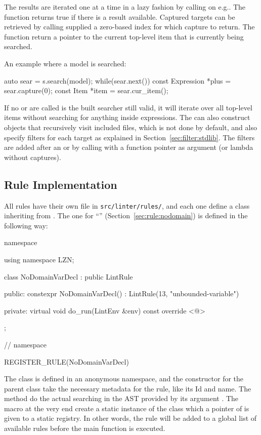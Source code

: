 \documentclass[a4paper,12pt]{article}
\newcommand{\ruleref}[1]{``\nameref{sec:rule:#1}'' (Section~\ref{sec:rule:#1})}
\begin{document}
The results are iterated one at a time in a lazy fashion by calling  on e.g.\@ {}.
The function returns true if there is a result available. Captured targets can be
retrieved by calling  supplied a zero-based index for which capture to return.
The function  return a pointer to the current top-level item that is currently
being searched.

An example where a model is searched:
\begin{cppp}[style=nonumbers]
auto sear = s.search(model);
while(sear.next()) {
  const Expression *plus = sear.capture(0);
  const Item *item = sear.cur_item();
}
\end{cppp}

If no  or  are called is the built searcher still valid, it will
iterate over all top-level items without searching for anything inside expressions.
The  can also construct  objects that recursively visit
included files, which is not done by default, and also specify filters for each target as
explained in Section~\ref{sec:filter:stdlib}. The filters are added after an 
or  by calling  with a function pointer as argument (or lambda
without captures).

\fussy %
\subsection{Rule Implementation}\label{sec:impl:rules}
All rules have their own file in \texttt{src/linter/rules/}, and each one define a class
inheriting from . The one for \ruleref{nodomain} is defined in the following way:
\begin{cppp}
namespace {
using namespace LZN;

class NoDomainVarDecl : public LintRule {
public:
  constexpr NoDomainVarDecl() : LintRule(13, "unbounded-variable") {}

private:
  virtual void do_run(LintEnv &env) const override {<@\dots@>}
};

} // namespace

REGISTER_RULE(NoDomainVarDecl)
\end{cppp}
The class is defined in an anonymous namespace, and the constructor for the parent class take
the necessary metadata for the rule, like its Id and name. The method  do the
actual searching in the AST provided by its argument . The macro at the very end
create a static instance of the class which a pointer of is given to a static registry.
In other words, the rule will be added to a global list of available rules before the main
function is executed.
\end{document}
